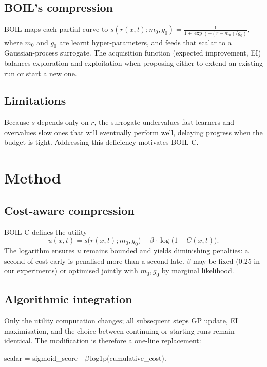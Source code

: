 \documentclass{article} %
\begin{document}
\subsection{BOIL's compression}
BOIL maps each partial curve to \(s(r(x,t);m_0,g_0)=\frac{1}{1+\exp(-(r-m_0)/g_0)}\), where \(m_0\) and \(g_0\) are learnt hyper-parameters, and feeds that scalar to a Gaussian-process surrogate. The acquisition function (expected improvement, EI) balances exploration and exploitation when proposing either to extend an existing run or start a new one.

\subsection{Limitations}
Because \(s\) depends only on \(r\), the surrogate undervalues fast learners and overvalues slow ones that will eventually perform well, delaying progress when the budget is tight. Addressing this deficiency motivates BOIL-C.

\section{Method}
\label{sec:method}
\subsection{Cost-aware compression}
BOIL-C defines the utility
\[ u(x,t) = s\big(r(x,t); m_0, g_0\big) - \beta\cdot\log\big(1 + C(x,t)\big). \]
The logarithm ensures \(u\) remains bounded and yields diminishing penalties: a second of cost early is penalised more than a second late. \(\beta\) may be fixed (0.25 in our experiments) or optimised jointly with \(m_0,g_0\) by marginal likelihood.

\subsection{Algorithmic integration}
Only the utility computation changes; all subsequent steps GP update, EI maximisation, and the choice between continuing or starting runs remain identical. The modification is therefore a one-line replacement:

scalar = sigmoid\_score - \(\beta\)\,log1p(cumulative\_cost).
\end{document}
